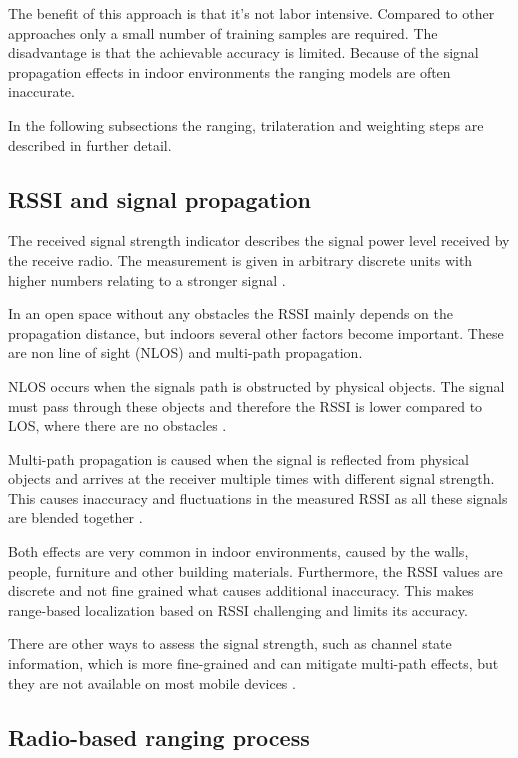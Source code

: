 The benefit of this approach is that it's not labor intensive. Compared to other approaches only a small number of training samples are required. The disadvantage is that the achievable accuracy is limited. Because of the signal propagation effects in indoor environments the ranging models are often inaccurate.

In the following subsections the ranging, trilateration and weighting steps are described in further detail.

\subsection{RSSI and signal propagation}

The received signal strength indicator describes the signal power level received by the receive radio. The measurement is given in arbitrary discrete units with higher numbers relating to a stronger signal \citep{RSSIwikipedia}.

In an open space without any obstacles the RSSI mainly depends on the propagation distance, but indoors several other factors become important. These are non line of sight (NLOS) and multi-path propagation.

NLOS occurs when the signals path is obstructed by physical objects. The signal must pass through these objects and therefore the RSSI is lower compared to LOS, where there are no obstacles \cite{JoseMaster}.

Multi-path propagation is caused when the signal is reflected from physical objects and arrives at the receiver multiple times with different signal strength. This causes inaccuracy and fluctuations in the measured RSSI as all these signals are blended together \cite{multipathEffects}.

Both effects are very common in indoor environments, caused by the walls, people, furniture and other building materials. Furthermore, the RSSI values are discrete and not fine grained what causes additional inaccuracy. This makes range-based localization based on RSSI challenging and limits its accuracy.

There are other ways to assess the signal strength, such as channel state information, which is more fine-grained and can mitigate multi-path effects, but they are not available on most mobile devices \cite{JoseMaster,FineGrainedIndoorTracking}.

\subsection{Radio-based ranging process}
\label{Ranging}


